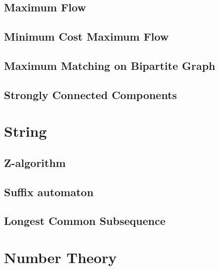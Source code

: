 \documentclass[a4paper,11pt]{article}
\begin{document}
  \subsection{Maximum Flow}
    
  
  \subsection{Minimum Cost Maximum Flow}
    
  	
  \subsection{Maximum Matching on Bipartite Graph}
    
  
  \subsection{Strongly Connected Components}
    

\section{String}
  \subsection{Z-algorithm}
      

  \subsection{Suffix automaton}
      
  
  \subsection{Longest Common Subsequence}
    

\section{Number Theory}
  
\end{document}
